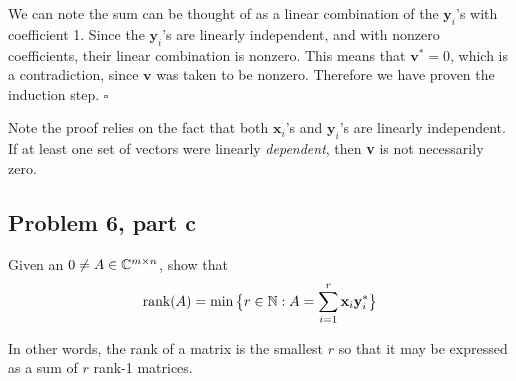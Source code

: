 \begin{solution}
    We can note the sum can be thought of as a linear combination of the $\textbf{y}_i$'s with coefficient 1. Since the $\textbf{y}_i$'s are linearly independent, and with nonzero coefficients, their linear combination is nonzero. This means that $\textbf{v}^* = 0$, which is a contradiction, since $\textbf{v}$ was taken to be nonzero. Therefore we have proven the induction step. $\square$ 

    Note the proof relies on the fact that both $\textbf{x}_i$'s and $\textbf{y}_i$'s are linearly independent. If at least one set of vectors were linearly \textit{dependent}, then \textbf{v} is not necessarily zero. 
\end{solution}

\subsection{Problem 6, part c}
Given an $0 \neq A \in \mathbb{C}^{m\times n}$, show that 
\[
\text{rank}(A) = \min \big\{ r \in \mathbb{N} : A = \sum_{i = 1}^r \textbf{x}_i\textbf{y}_i^*\big\}
\]

In other words, the rank of a matrix is the smallest $r$ so that it may be expressed as a sum of $r$ rank-1 matrices.

